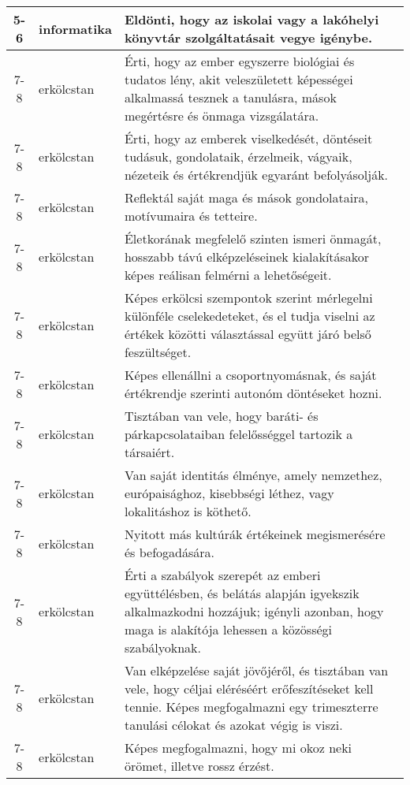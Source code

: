 \begin{small}
\begin{longtable}{c | p{2cm} |  p{11cm} }
              5-6 & informatika & Eldönti, hogy az iskolai vagy a lakóhelyi könyvtár szolgáltatásait vegye igénybe. \\ \hline
              7-8 & erkölcstan & Érti, hogy az ember egyszerre biológiai és tudatos lény, akit veleszületett képességei alkalmassá tesznek a tanulásra, mások megértésre és önmaga vizsgálatára. \\ \hline
              7-8 & erkölcstan & Érti, hogy az emberek viselkedését, döntéseit tudásuk, gondolataik, érzelmeik, vágyaik, nézeteik és értékrendjük egyaránt befolyásolják. \\ \hline
              7-8 & erkölcstan & Reflektál saját maga és mások gondolataira, motívumaira és tetteire. \\ \hline
              7-8 & erkölcstan & Életkorának megfelelő szinten ismeri önmagát, hosszabb távú elképzeléseinek kialakításakor képes reálisan felmérni a lehetőségeit. \\ \hline
              7-8 & erkölcstan & Képes erkölcsi szempontok szerint mérlegelni különféle cselekedeteket, és el tudja viselni az értékek közötti választással együtt járó belső feszültséget. \\ \hline
              7-8 & erkölcstan & Képes ellenállni a csoportnyomásnak, és saját értékrendje szerinti autonóm döntéseket hozni. \\ \hline
              7-8 & erkölcstan & Tisztában van vele, hogy baráti- és párkapcsolataiban felelősséggel tartozik a társaiért. \\ \hline
              7-8 & erkölcstan & Van saját identitás élménye, amely nemzethez, európaisághoz, kisebbségi léthez, vagy lokalitáshoz is köthető. \\ \hline
              7-8 & erkölcstan & Nyitott más kultúrák értékeinek megismerésére és befogadására. \\ \hline
              7-8 & erkölcstan & Érti a szabályok szerepét az emberi együttélésben, és belátás alapján igyekszik alkalmazkodni hozzájuk; igényli azonban, hogy maga is alakítója lehessen a közösségi szabályoknak. \\ \hline
              7-8 & erkölcstan & Van elképzelése saját jövőjéről, és tisztában van vele, hogy céljai eléréséért erőfeszítéseket kell tennie. Képes megfogalmazni egy trimeszterre tanulási célokat és azokat végig is viszi. \\ \hline
              7-8 & erkölcstan & Képes megfogalmazni, hogy mi okoz neki örömet, illetve rossz érzést. \\ \hline

\end{longtable}
\end{small}
